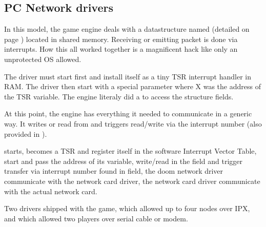 




\subsection{PC Network drivers}
In this model, the game engine deals with a datastructure named  (detailed on page \pageref{doomcom_t.c}) located in shared memory. Receiving or emitting packet is done via interrupts. How this all worked together is a magnificent hack like only an unprotected OS allowed.\\
\par
The driver must start first and install itself as a tiny TSR interrupt handler in RAM. The driver then start  with a special parameter  where X was the address of the TSR  variable. The engine literaly did a  to access the structure fields.\\
\par

\par
 At this point, the engine has everything it needed to communicate in a generic way. It writes or read from  and triggers read/write via the interrupt number (also provided in ).\\
\par
{}
\par
{}  starts, becomes a TSR and register itself in the software Interrupt Vector Table,   start  and pass the address of its  variable,   write/read in the   field and trigger transfer via interrupt number found in  field,  the doom network driver communicate with the network card driver,  the network card driver communicate with the actual network card.\\
\par
Two drivers shipped with the game,  which allowed up to four nodes over IPX, and  which allowed two players over serial cable or modem.






